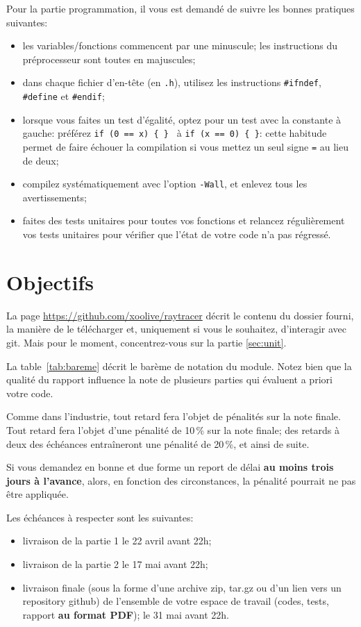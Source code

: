 \documentclass[10pt, a4paper ]{article}
\begin{document}
Pour la partie programmation, il vous est demandé de suivre les bonnes pratiques
suivantes:
\begin{itemize}
    \item les variables/fonctions commencent par une minuscule; les instructions
        du préprocesseur sont toutes en majuscules;
    \item dans chaque fichier d'en-tête (en \texttt{.h}), utilisez les
        instructions \texttt{\#ifndef}, \texttt{\#define} et \texttt{\#endif};
    \item lorsque vous faites un test d'égalité, optez pour un test avec la
        constante à gauche: préférez \texttt{if (0 == x) \{ \} } à
        \texttt{if (x == 0) \{ \}}: cette habitude permet de faire échouer la
        compilation si vous mettez un seul signe \texttt{=} au lieu de deux;
    \item compilez systématiquement avec l'option \texttt{-Wall}, et enlevez
        tous les avertissements;
    \item faites des tests unitaires pour toutes vos fonctions et relancez
        régulièrement vos tests unitaires pour vérifier que l'état de votre code
        n'a pas régressé.
\end{itemize}


\section{Objectifs}

La page \url{https://github.com/xoolive/raytracer} décrit le contenu du dossier
fourni, la manière de le télécharger et, uniquement si vous le souhaitez,
d'interagir avec git. Mais pour le moment, concentrez-vous sur la partie
\ref{sec:unit}.

La table~\ref{tab:bareme} décrit le barème de notation du module. Notez bien que
la qualité du rapport influence la note de plusieurs parties qui évaluent a
priori votre code.

Comme dans l'industrie, tout retard fera l'objet de pénalités sur la note
finale. Tout retard fera l'objet d'une pénalité de 10\,\% sur la note finale;
des retards à deux des échéances entraîneront une pénalité de 20\,\%, et ainsi
de suite.

Si vous demandez en bonne et due forme un report de délai \textbf{au moins trois
jours à l'avance}, alors, en fonction des circonstances, la pénalité pourrait
ne pas être appliquée.

Les échéances à respecter sont les suivantes:
\begin{itemize}
    \item livraison de la partie 1 le 22 avril avant 22h;
    \item livraison de la partie 2 le 17 mai avant 22h;
    \item livraison finale (sous la forme d'une archive zip, tar.gz ou d'un lien
        vers un repository github) de l'ensemble de votre espace de travail
        (codes, tests, rapport \textbf{au format PDF}); le 31 mai avant 22h.
\end{itemize}
\end{document}
